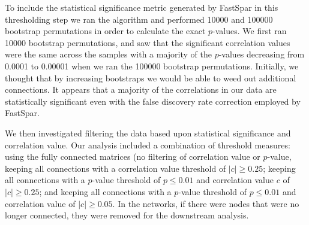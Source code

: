 To include the statistical significance metric generated by \acrshort{FastSpar} in this thresholding step we ran the algorithm and performed 10000 and 100000 bootstrap permutations in order to calculate the exact $p$-values. We first ran 10000 bootstrap permutations, and saw that the significant correlation values were the same across the samples with a majority of the $p$-values decreasing from 0.0001 to 0.00001 when we ran the 100000 bootstrap permutations. Initially, we thought that by increasing bootstraps we would be able to weed out additional connections. It appears that a majority of the correlations in our data are statistically significant even with the false discovery rate correction employed by \acrshort{FastSpar}.

 We then investigated filtering the data based upon statistical significance and correlation value. Our analysis included a combination of threshold measures: using the fully connected matrices (no filtering of correlation value or $p$-value, keeping all connections with a correlation value threshold of $|c| \geq 0.25$; keeping all connections with a $p$-value threshold of $p \leq 0.01$ and correlation value $c$ of $|c| \geq 0.25$; and keeping all connections with a $p$-value threshold of $p \leq 0.01$ and correlation value of $|c| \geq 0.05$. In the networks, if there were nodes that were no longer connected, they were removed for the downstream analysis.

